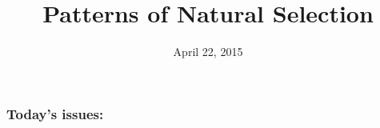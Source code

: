 


% 



\title[Patterns of Selection]{Patterns of Natural Selection}
\date{April 22, 2015}



\begin{noheadline}
\maketitle
\end{noheadline}


\begin{noheadline}
\begin{frame}
\frametitle{Today's issues:}
\tableofcontents
\end{frame}
\end{noheadline}

